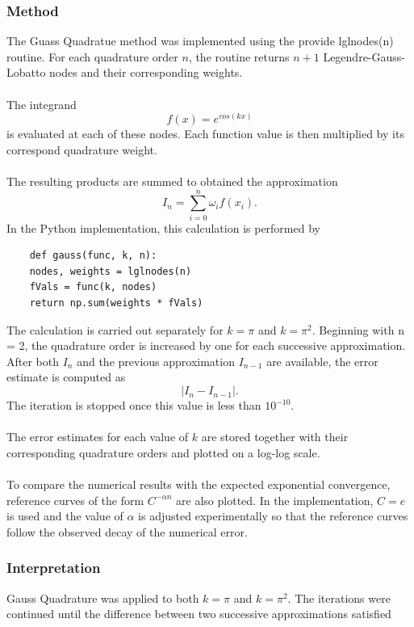 \documentclass[12pt]{article}
\begin{document}
\subsubsection{Method}
The Guass Quadratue method was implemented using the provide lglnodes(n) routine. For each quadrature order $n$, the routine returns $n + 1$ Legendre-Gauss-Lobatto nodes and their corresponding weights.\\\\
The integrand \begin{equation}
    f(x) = e^{cos(kx)}
\end{equation}
is evaluated at each of these nodes. Each function value is then multiplied by its correspond quadrature weight. \\\\
The resulting products are summed to obtained the approximation \begin{equation}
    I_n = \sum_{i=0}^{n}\omega_if(x_i).
\end{equation}
In the Python implementation, this calculation is performed by
\begin{lstlisting}
    def gauss(func, k, n):
    nodes, weights = lglnodes(n)
    fVals = func(k, nodes)
    return np.sum(weights * fVals)
\end{lstlisting}
The calculation is carried out separately for $k = \pi$ and $k = \pi^2$. Beginning with n = 2, the quadrature order is increased by one for each successive approximation. After both $I_n$ and the previous approximation $I_{n-1}$ are available, the error estimate is computed as 
\begin{equation}
    |I_n - I_{n-1}|.
\end{equation}
The iteration is stopped once this value is less than $10^{-10}$.\\\\
The error estimates for each value of $k$ are stored together with their corresponding quadrature orders and plotted on a log-log scale.\\\\
To compare the numerical results with the expected exponential convergence, reference curves of the form $C^{-\alpha n}$ are also plotted. In the implementation, $C = e$ is used and the value of $\alpha$ is adjusted experimentally so that the reference curves follow the observed decay of the numerical error.


\subsubsection{Interpretation}
Gauss Quadrature was applied to both $k = \pi$ and $k = \pi^2$. The iterations were continued until the difference between two successive approximations satisfied
\end{document}
